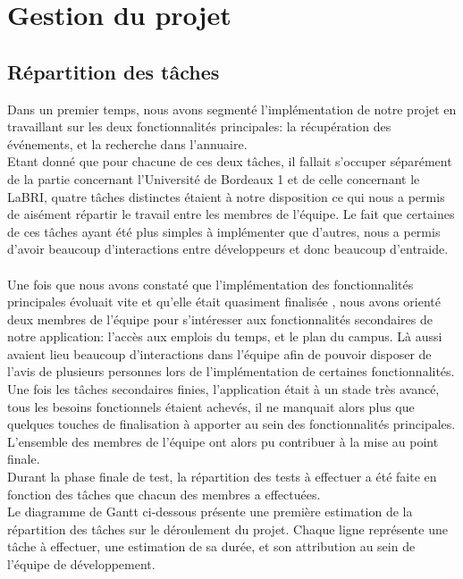 \chapter{Gestion du projet}

\section{Répartition des tâches}
Dans un premier temps, nous avons segmenté l’implémentation de notre projet en travaillant sur les deux fonctionnalités principales: la récupération des événements, et la recherche dans l’annuaire. \\
Etant donné que pour chacune de ces deux tâches, il fallait s’occuper séparément de la partie concernant l’Université de Bordeaux 1 et de celle concernant le LaBRI, quatre tâches distinctes étaient à notre disposition ce qui nous a permis de aisément répartir le travail entre les membres de l’équipe. Le fait que certaines de ces tâches ayant été plus simples à implémenter que d’autres, nous a permis d’avoir beaucoup d’interactions entre développeurs et donc beaucoup d’entraide.\\\\

Une fois que nous avons constaté que l’implémentation des fonctionnalités principales évoluait vite et qu’elle était quasiment finalisée , nous avons orienté deux membres de l’équipe pour s’intéresser aux fonctionnalités secondaires de notre application: l’accès aux emplois du temps, et le plan du campus. Là aussi avaient lieu beaucoup d'interactions dans l’équipe afin de pouvoir disposer de l’avis de plusieurs personnes lors de l’implémentation de certaines fonctionnalités.\\
Une fois les tâches secondaires finies, l’application était à un stade très avancé, tous les besoins fonctionnels  étaient achevés, il ne manquait alors plus que quelques touches de finalisation à apporter au sein des fonctionnalités principales. L’ensemble des membres de l’équipe ont alors pu contribuer à la mise au point finale.\\
Durant la phase finale de test, la répartition des tests à effectuer a été faite en fonction des tâches que chacun des membres a effectuées.\\
Le diagramme de Gantt ci-dessous présente une première estimation de la répartition des tâches sur le déroulement du projet. Chaque ligne représente une tâche à effectuer, une estimation de sa durée, et son attribution au sein de l'équipe de développement. \\


